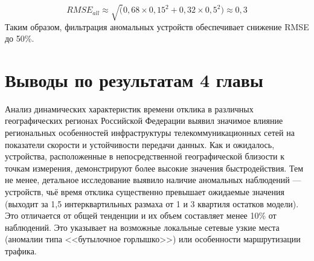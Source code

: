 \begin{equation}
	\label{rmse_extim}
	RMSE_{all} \approx \sqrt(0,68 \times 0,15^2 + 0,32 \times 0,5^2 ) \approx 0,3
\end{equation}
Таким образом, фильтрация аномальных устройств обеспечивает снижение RMSE до 50\%.


\section{Выводы по результатам 4 главы}\label{subsec:ch4/sect5}



Анализ динамических характеристик времени отклика в различных географических регионах Российской Федерации выявил значимое влияние региональных особенностей инфраструктуры телекоммуникационных сетей на показатели скорости и устойчивости передачи данных. Как и ожидалось, устройства, расположенные в непосредственной географической близости к точкам измерения, демонстрируют более высокие значения быстродействия. Тем не менее, детальное исследование выявило наличие аномальных наблюдений — устройств, чьё время отклика существенно превышает ожидаемые значения (выходит за 1,5 интерквартильных размаха от 1 и 3 квартиля остатков модели). Это отличается от общей тенденции и их объем составляет менее 10\% от наблюдений. Это указывает на возможные локальные сетевые узкие места (аномалии типа <<бутылочное горлышко>>) или особенности маршрутизации трафика.

